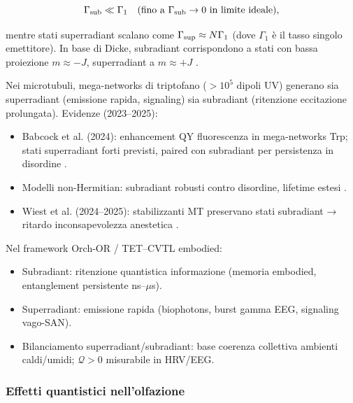 \documentclass[11pt,a4paper]{article}
\let\oldcite\cite
\renewcommand{\cite}{\protect\oldcite}
\theoremstyle{plain}
\theoremstyle{definition}
\begin{document}
\begin{equation}
    \Gamma_{\rm sub} \ll \Gamma_1 \quad \text{(fino a } \Gamma_{\rm sub} \to 0 \text{ in limite ideale)},
    \label{eq:Gamma_sub}
\end{equation}


\vspace{0.2cm}

mentre stati superradiant scalano come $\Gamma_{\rm sup} \approx N \Gamma_1$ (dove $\Gamma_1$ è il tasso singolo emettitore). In base di Dicke, subradiant corrispondono a stati con bassa proiezione $m \approx -J$, superradiant a $m \approx +J$ \cite{Agarwal1974, Celardo2019}.

\vspace{0.2cm}

Nei microtubuli, mega-networks di triptofano ($>10^5$ dipoli UV) generano sia superradiant (emissione rapida, signaling) sia subradiant (ritenzione eccitazione prolungata). Evidenze (2023–2025):

\begin{itemize}
    \item Babcock et al. (2024): enhancement QY fluorescenza in mega-networks Trp; stati superradiant forti previsti, paired con subradiant per persistenza in disordine \cite{Babcock2024}.
    \item Modelli non-Hermitian: subradiant robusti contro disordine, lifetime estesi \cite{Celardo2019}.
    \item Wiest et al. (2024–2025): stabilizzanti MT preservano stati subradiant → ritardo inconsapevolezza anestetica \cite{Wiest2025niaf011}.
\end{itemize}


\vspace{0.3cm}

Nel framework Orch-OR / TET–CVTL embodied:
\begin{itemize}
    \item Subradiant: ritenzione quantistica informazione (memoria embodied, entanglement persistente ns–$\mu$s).
    \item Superradiant: emissione rapida (biophotons, burst gamma EEG, signaling vago-SAN).
    \item Bilanciamento superradiant/subradiant: base coerenza collettiva ambienti caldi/umidi; $\mathcal{Q} > 0$ misurabile in HRV/EEG.
\end{itemize}


\vspace{0.4cm}

\subsubsection{Effetti quantistici nell'olfazione}
\end{document}
